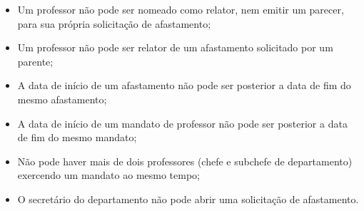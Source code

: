\begin{itemize}
    \item Um professor não pode ser nomeado como relator, nem emitir um parecer, para sua própria solicitação de afastamento;
    \item Um professor não pode ser relator de um afastamento solicitado por um parente;
    \item A data de início de um afastamento não pode ser posterior a data de fim do mesmo afastamento;
    \item A data de início de um mandato de professor não pode ser posterior a data de fim do mesmo mandato;
    \item Não pode haver mais de dois professores (chefe e subchefe de departamento) exercendo um mandato ao mesmo tempo;
    \item O secretário do departamento não pode abrir uma solicitação de afastamento.
\end{itemize}